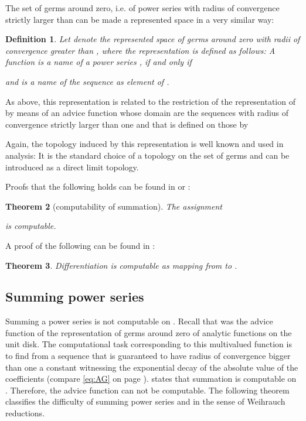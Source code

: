 \documentclass{eptcs-modified}
\newtheorem{theorem}{Theorem}
\newtheorem{definition}[theorem]{Definition}
\begin{document}
			The set  of germs around zero, i.e. of power series with radius of convergence strictly larger than  can be made a represented space in a very similar way:
			\begin{definition}
				Let  denote the represented space of germs around zero with radii of convergence greater than , where the representation is defined as follows: A function  is a name of a power series , if and only if
				
				and  is a name of the sequence  as element of .
			\end{definition}

			As above, this representation is related to the restriction of the representation of  by means of an advice function  whose domain are the sequences with radius of convergence strictly larger than one and that is defined on those by
			
			Again, the topology induced by this representation is well known and used in analysis: It is the standard choice of a topology on the set of germs and can be introduced as a direct limit topology.

			Proofs that the following holds can be found in \cite{MR3377508} or \cite{Muller1995}:
			\begin{theorem}[computability of summation]\label{thm:analytic rep}
				The assignment
				
				is computable.
			\end{theorem}
			A proof of the following can be found in \cite{MR3377508}:
			\begin{theorem}\label{thm:differntiation}
				Differentiation is computable as mapping from  to .
			\end{theorem}

		\subsection{Summing power series}\label{sec:sub:summing power series}
			Summing a power series is not computable on .
			Recall that  was the advice function of the representation  of germs around zero of analytic functions on the unit disk.
			The computational task corresponding to this multivalued function is to find from a sequence that is guaranteed to have radius of convergence bigger than one a constant witnessing the exponential decay of the absolute value of the coefficients (compare \cref{eq:AG} on page \pageref{eq:AG}).
			 states that summation is computable on .
			Therefore, the advice function  can not be computable.
			The following theorem classifies the difficulty of summing power series and  in the sense of Weihrauch reductions.
\end{document}

